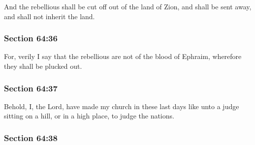 		And the rebellious shall be cut off out of the land of Zion, and shall be sent away, and shall not inherit the land.


	\subsubsection{Section 64:36} %
		\label{DC64-36}

		For, verily I say that the rebellious are not of the blood of Ephraim, wherefore they shall be plucked out.


	\subsubsection{Section 64:37} %
		\label{DC64-37}

		Behold, I, the Lord, have made my church in these last days like unto a judge sitting on a hill, or in a high place, to judge the nations.


	\subsubsection{Section 64:38} %
		\label{DC64-38}

